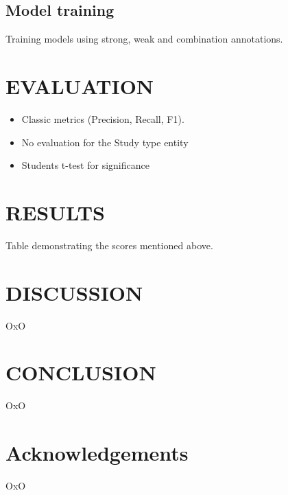 \documentclass[10.7pt,]{article}
\begin{document}
\subsection{Model training}\label{modtrain}
Training models using strong, weak and combination annotations.
%
%
%
\section{EVALUATION}\label{eval}
%
\begin{itemize}
    \item Classic metrics (Precision, Recall, F1).
    \item No evaluation for the Study type entity
    \item Students t-test for significance
\end{itemize}
%
%
%
\section{RESULTS}\label{results}
%
Table demonstrating the scores mentioned above.
%
%
%
\section{DISCUSSION}\label{discussion}
%
OxO
%
%
%
\section{CONCLUSION}\label{conclusion}
%
OxO
%
%
%
\section{Acknowledgements}\label{acknowledgements}
%
OxO
%
%
%


\end{document}
